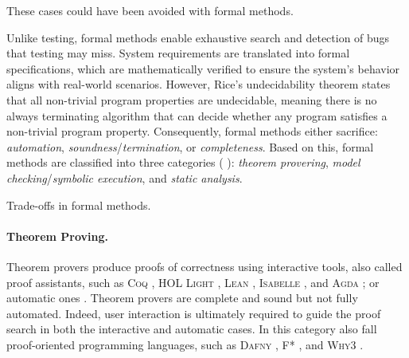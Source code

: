 These cases could have been avoided with formal methods.

Unlike testing, formal methods enable exhaustive search and detection of bugs that testing may miss.
System requirements are translated into formal specifications, which are mathematically verified to ensure the system's behavior aligns with real-world scenarios.
However, Rice's undecidability theorem  states that all non-trivial program properties are undecidable, meaning there is no always terminating algorithm that can decide whether any program satisfies a non-trivial program property.
Consequently, formal methods either sacrifice: \emph{automation}, \emph{soundness}/\emph{termination}, or \emph{completeness}.
Based on this, formal methods are classified into three categories  (\cf{} ): \emph{theorem provering}, \emph{model checking}/\emph{symbolic execution}, and \emph{static analysis}.

\begin{marginfigure}
  \caption{Trade-offs in formal methods.}
\end{marginfigure}

\paragraph{Theorem Proving.}

Theorem provers  produce proofs of correctness using interactive tools, also called proof assistants, such as \textsc{Coq} , \textsc{HOL Light} , \textsc{Lean} , \textsc{Isabelle} , and \textsc{Agda} ; or automatic ones .
Theorem provers are complete and sound but not fully automated.
Indeed, user interaction is ultimately required to guide the proof search in both the interactive and automatic cases.
In this category also fall proof-oriented programming languages, such as \textsc{Dafny} ,  \textsc{F*} , and \textsc{Why3} .

